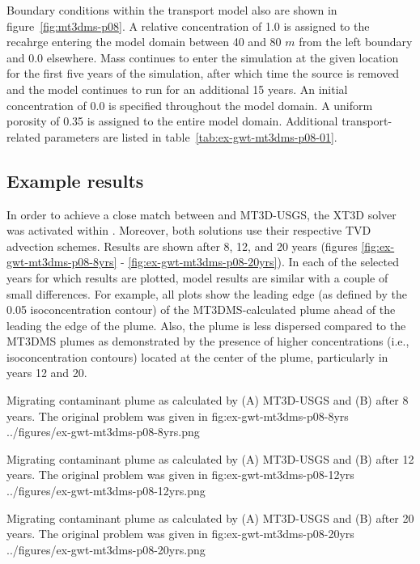 

Boundary conditions within the transport model also are shown in figure~\ref{fig:mt3dms-p08}.  A relative concentration of 1.0 is assigned to the recahrge entering the model domain between 40 and 80 $m$ from the left boundary and 0.0 elsewhere.  Mass continues to enter the simulation at the given location for the first five years of the simulation, after which time the source is removed and the model continues to run for an additional 15 years.  An initial concentration of 0.0 is specified throughout the model domain.  A uniform porosity of 0.35 is assigned to the entire model domain.  Additional transport-related parameters are listed in table~\ref{tab:ex-gwt-mt3dms-p08-01}.

\subsection{Example results}

In order to achieve a close match between \mf and MT3D-USGS, the XT3D solver was activated within \mf.  Moreover, both solutions use their respective TVD advection schemes.  Results are shown after 8, 12, and 20 years (figures \ref{fig:ex-gwt-mt3dms-p08-8yrs} - \ref{fig:ex-gwt-mt3dms-p08-20yrs}).  In each of the selected years for which results are plotted, model results are similar with a couple of small differences.  For example, all plots show the leading edge (as defined by the 0.05 isoconcentration contour) of the MT3DMS-calculated plume ahead of the leading the edge of the \mf plume.  Also, the \mf plume is less dispersed compared to the MT3DMS plumes as demonstrated by the presence of higher concentrations (i.e., isoconcentration contours) located at the center of the plume, particularly in years 12 and 20.

\begin{StandardFigure}
	{Migrating contaminant plume as calculated by (A) MT3D-USGS and (B) \mf after 8 years.  The original problem was given in \citep{sudicky1989}} 
	{fig:ex-gwt-mt3dms-p08-8yrs}
	{../figures/ex-gwt-mt3dms-p08-8yrs.png}
\end{StandardFigure}

\begin{StandardFigure}
	{Migrating contaminant plume as calculated by (A) MT3D-USGS and (B) \mf after 12 years.  The original problem was given in \citep{sudicky1989}} 
	{fig:ex-gwt-mt3dms-p08-12yrs}
	{../figures/ex-gwt-mt3dms-p08-12yrs.png}
\end{StandardFigure}

\begin{StandardFigure}
	{Migrating contaminant plume as calculated by (A) MT3D-USGS and (B) \mf after 20 years.  The original problem was given in \citep{sudicky1989}} 
	{fig:ex-gwt-mt3dms-p08-20yrs}
	{../figures/ex-gwt-mt3dms-p08-20yrs.png}
\end{StandardFigure}
